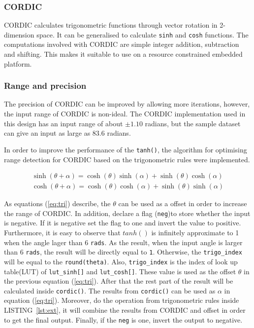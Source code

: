 \documentclass[journal]{IEEEtran}
\newcommand{\eref}[1]{(\ref{#1})}
\newcommand{\lref}[1]{LISTING~\ref{#1}}
\begin{document}
\subsubsection{CORDIC}

CORDIC calculates trigonometric functions through vector rotation in 2-dimension space. It can be generalised to calculate \texttt{sinh} and \texttt{cosh} functions. The computations involved with CORDIC are simple integer addition, subtraction and shifting. This makes it suitable to use on a resource constrained embedded platform.

\subsubsection{Range and precision}

The precision of CORDIC can be improved by allowing more iterations, however, the input range of CORDIC is non-ideal. The CORDIC implementation used in this design has an input range of about $\pm 1.10$ radians, but the sample dataset can give an input as large as $83.6$ radians.

In order to improve the performance of the \texttt{tanh()}, the algorithm for optimising range detection for CORDIC based on the trigonometric rules were implemented. 

\begin{align}
\sinh(\theta + \alpha) = \cosh(\theta)\sinh(\alpha) + \sinh(\theta)\cosh(\alpha)
\label{eq:tri}\\
\cosh(\theta + \alpha) = \cosh(\theta)\cosh(\alpha) + \sinh(\theta)\sinh(\alpha)
\end{align}

As equations \eref{eq:tri} describe, the $\theta$ can be used as a offset in order to increase the range of CORDIC.  In addition, declare a flag (\texttt{neg})to store whether the input is negative. If it is negative set the flag to one and invert the value to positive. Furthermore, it is easy to observe that $tanh()$ is infinitely approximate to 1 when the angle lager than 6 \texttt{rads}. As the result, when the input angle is larger than 6 \texttt{rads}, the result will be directly equal to \texttt{1}. Otherwise, the \texttt{trigo\_index} will be equal to the \texttt{round(theta)}. Also, \texttt{trigo\_index} is the index of look up table(LUT) of \texttt{lut\_sinh[]} and \texttt{lut\_cosh[]}. These value is used as the offset $\theta$ in the previous equation \eref{eq:tri}. After that the rest part of the result will be calculated inside \texttt{cordic()}. The results from \texttt{cordic()} can be used as $\alpha$ in equation \eref{eq:tri}. Moreover, do the operation from trigonometric rules inside \lref{lst:ext}, it will combine the results from CORDIC and offset in order to get the final output. Finally, if the \texttt{neg} is one, invert the output to negative. \cite{llamocca2007fixed}
\end{document}
